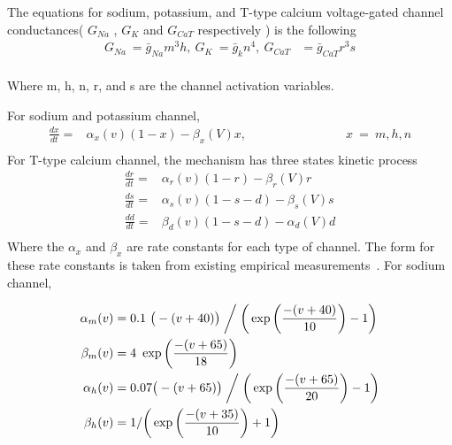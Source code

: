 The equations for sodium, potassium, and T-type calcium voltage-gated channel conductances( $G_{Na}$ , $G_{K}$ and $G_{CaT}$ respectively ) is the following
\begin{align*} 
G_{Na}\ =\bar{g}_{Na}m^{3}h ,\: G_{K}\ =\bar{g}_{k}n^{4},\: G_{CaT}&=\bar{g}_{CaT} r^{3}s\\
\end{align*}

Where m, h, n, r, and s are the channel activation variables. 

For sodium and potassium channel,
\begin{align*}
\frac{dx}{dt} =&\alpha_{x}(v)(1-x) - \beta_{x}(V)x, \hspace{8em} x\ =\ m,h,n \\
\end{align*}
For T-type calcium channel, the mechanism has three states kinetic process
\begin{align*}
\frac{dr}{dt} =& \alpha_{r}(v)(1-r) - \beta_r(V)r \\
\frac{ds}{dt} =& \alpha_{s}(v)(1-s-d) - \beta_{s}(V)s \\
\frac{d d}{dt} =& \beta_{d}(v)(1-s-d) - \alpha_d(V)d \\
\end{align*}
Where the $\alpha_x$ and $\beta_x$ are rate constants for each type of channel. The form for these rate constants is taken from existing empirical measurements~\cite{hodgkin1952quantitative, carnevale2006neuron, wang1991model}.
\clearpage
For sodium channel, %

\begin{align*} 
\alpha_{m}(v) &= 0.1\ \big(-(v+40)\big) \biggm/ \bigg( \exp \bigg( \frac{-(v+40)}{10} \bigg) - 1 \bigg)\\
\beta_{m}(v) &= 4\ \exp \bigg(\frac{-(v+65)}{18}\bigg)\\
\alpha_{h}(v) &= 0.07\big(-(v+65)\big) \biggm/ \bigg( \exp \bigg( \frac{-(v+65)}{20} \bigg) - 1 \bigg)\\
\beta_{h}(v) &= 1 / \bigg( \exp \bigg(\frac{-(v+35)}{10}\bigg) + 1 \bigg)\\
\end{align*}

